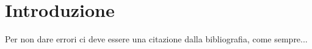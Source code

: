  \chapter{Introduzione}
Per non dare errori ci deve essere una citazione dalla bibliografia, come sempre... \cite{gpl}

